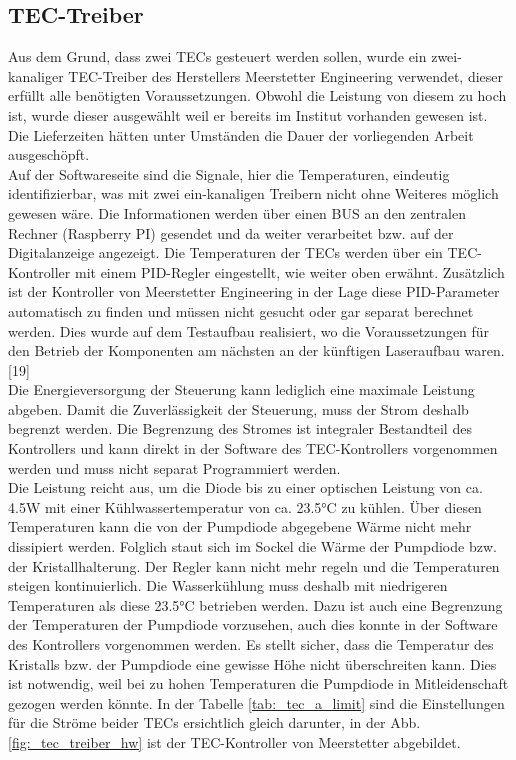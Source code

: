 \subsection{TEC-Treiber}
\label{label_tec_treiber}
Aus dem Grund, dass zwei TECs gesteuert werden sollen, wurde ein zwei-kanaliger TEC-Treiber des Herstellers Meerstetter Engineering verwendet, dieser erfüllt alle benötigten Voraussetzungen. Obwohl die Leistung von diesem zu hoch ist, wurde dieser ausgewählt weil er bereits im Institut vorhanden gewesen ist. Die Lieferzeiten hätten unter Umständen die Dauer der vorliegenden Arbeit ausgeschöpft.\\
Auf der Softwareseite sind die Signale, hier die Temperaturen, eindeutig identifizierbar, was mit zwei ein-kanaligen Treibern nicht ohne Weiteres möglich gewesen wäre. Die Informationen werden über einen BUS an den zentralen Rechner (Raspberry PI) gesendet und da weiter verarbeitet bzw. auf der Digitalanzeige angezeigt.
Die Temperaturen der TECs werden über ein TEC-Kontroller mit einem PID-Regler eingestellt, wie weiter oben erwähnt. Zusätzlich ist der Kontroller von Meerstetter Engineering in der Lage diese PID-Parameter automatisch zu finden und müssen nicht gesucht oder gar separat berechnet werden. Dies wurde auf dem Testaufbau realisiert, wo die Voraussetzungen für den Betrieb der Komponenten am nächsten an der künftigen Laseraufbau waren. [19]\\
Die Energieversorgung der Steuerung kann lediglich eine maximale Leistung abgeben. Damit die Zuverlässigkeit der Steuerung, muss der Strom deshalb begrenzt werden. Die Begrenzung des Stromes ist integraler Bestandteil des Kontrollers und kann direkt in der Software des TEC-Kontrollers vorgenommen werden und muss nicht separat Programmiert werden.\\
Die Leistung reicht aus, um die Diode bis zu einer optischen Leistung von ca. 4.5W mit einer Kühlwassertemperatur von ca. 23.5°C zu kühlen. Über diesen Temperaturen kann die von der Pumpdiode abgegebene Wärme nicht mehr dissipiert werden. Folglich staut sich im Sockel die Wärme der Pumpdiode bzw. der Kristallhalterung. Der Regler kann nicht mehr regeln und die Temperaturen steigen kontinuierlich. Die Wasserkühlung muss deshalb mit niedrigeren Temperaturen als diese 23.5°C betrieben werden. Dazu ist auch eine Begrenzung der Temperaturen der Pumpdiode vorzusehen, auch dies konnte in der Software des Kontrollers vorgenommen werden. Es stellt sicher, dass die Temperatur des Kristalls bzw. der Pumpdiode eine gewisse Höhe nicht überschreiten kann. Dies ist notwendig, weil bei zu hohen Temperaturen die Pumpdiode in Mitleidenschaft gezogen werden könnte. In der Tabelle \ref{tab:_tec_a_limit} sind die Einstellungen für die Ströme beider TECs ersichtlich gleich darunter, in der  Abb. \ref{fig:_tec_treiber_hw} ist der TEC-Kontroller von Meerstetter abgebildet.

